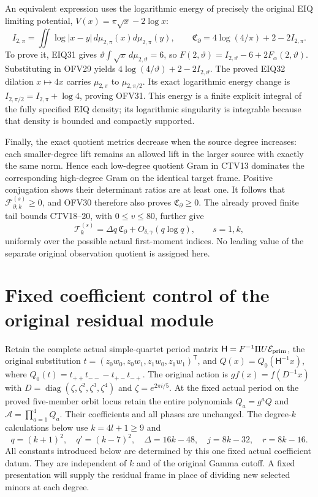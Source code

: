 \documentclass[11pt,a4paper]{article}
\begin{document}
An equivalent expression uses the logarithmic energy of precisely
the original EIQ limiting potential, $V(x)=\pi\sqrt{x}-2\log x$:
\[
I_{2,\pi}=\iint\log|x-y|\,d\mu_{2,\pi}(x)d\mu_{2,\pi}(y),
\qquad
\mathfrak C_{\partial}=4\log(4/\pi)+2-2I_{2,\pi}.
\tag{OFV31}
\]
To prove it, EIQ31 gives
$\vartheta\int\sqrt{x}\,d\mu_{2,\vartheta}=6$, so
$F(2,\vartheta)=I_{2,\vartheta}-6+2F_\alpha(2,\vartheta)$.
Substituting in OFV29 yields
$4\log(4/\vartheta)+2-2I_{2,\vartheta}$.
The proved EIQ32 dilation $x\mapsto4x$ carries $\mu_{2,\pi}$
to $\mu_{2,\pi/2}$. Its exact logarithmic energy change is
$I_{2,\pi/2}=I_{2,\pi}+\log4$, proving OFV31.
This energy is a finite explicit integral of the fully specified
EIQ density; its logarithmic singularity is integrable because
that density is bounded and compactly supported.

Finally, the exact quotient metrics decrease when the source degree
increases: each smaller-degree lift remains an allowed lift in the
larger source with exactly the same norm. Hence each low-degree
quotient Gram in CTV13 dominates the corresponding high-degree
Gram on the identical target frame. Positive conjugation shows
their determinant ratios are at least one. It follows that
$\mathcal F_{\partial,k}^{(s)}\ge0$, and OFV30 therefore also proves
$\mathfrak C_{\partial}\ge0$.
The already proved finite tail bounds CTV18--20, with
$0\le v\le80$, further give
\[
\mathcal T_k^{(s)}
=\Delta q\,\mathfrak C_{\partial}
+O_{\delta,\gamma}(q\log q),\qquad s=1,k,
\tag{OFV32}
\]
uniformly over the possible actual first-moment indices.
No leading value of the separate original observation quotient
is assigned here.


\clearpage
\section{Fixed coefficient control of the original residual module}
\label{sec:FMC}

Retain the complete actual simple-quartet period matrix
$\mathsf H=F^{-1}\Pi U\mathcal E_{\rm prim}$, the original substitution
$t=(z_0w_0,z_0w_1,z_1w_0,z_1w_1)^{\mathsf T}$, and
$Q(x)=Q_0(\mathsf H^{-1}x)$, where
$Q_0(t)=t_{++}t_{--}-t_{+-}t_{-+}$.
The original action is $g f(x)=f(D^{-1}x)$ with
$D=\operatorname{diag}(\zeta,\zeta^2,\zeta^3,\zeta^4)$ and
$\zeta=e^{2\pi i/5}$. At the fixed actual period on the proved
five-member orbit locus retain the entire polynomials
$Q_a=g^aQ$ and $\mathcal A=\prod_{a=1}^4Q_a$.
Their coefficients and all phases are unchanged.
The degree-$k$ calculations below use $k=4l+1\ge9$ and
\[
 q=(k+1)^2,\quad q'=(k-7)^2,\quad
 \Delta=16k-48,\quad j=8k-32,\quad r=8k-16.
 \tag{FMC1}
\]
All constants introduced below are determined by this one fixed
actual coefficient datum. They are independent of $k$ and of the
original Gamma cutoff. A fixed presentation will supply the residual
frame in place of dividing new selected minors at each degree.
\end{document}
